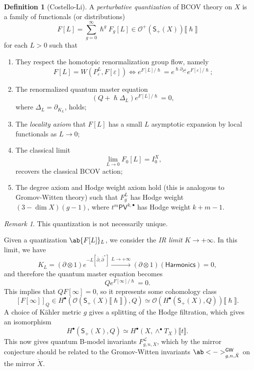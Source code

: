 \documentclass{amsart}
\theoremstyle{definition}
\newtheorem{defn}[thm]{Definition}
\theoremstyle{remark}
\newtheorem{rmk}[thm]{Remark}
\theoremstyle{plain}
\theoremstyle{definition}
\theoremstyle{remark}
\newcommand{\ep}{\varepsilon}
\newcommand{\mc}[1]{\mathcal{#1}}
\newcommand{\ms}[1]{\mathsf{#1}}
\newcommand{\1}{\mathbf{1}}
\newcommand{\2}{\mathbf{2}}
\newcommand{\3}{\mathbf{3}}
\newcommand{\ps}[1]{\lBrack #1 \rBrack}
\newcommand{\dbar}{\bar{\partial}}
\begin{document}
\begin{defn}[Costello-Li]
    A \textit{perturbative quantization} of BCOV theory on \(X\) is a family of functionals (or distributions)
    \[ F[L] = \sum_{g =0}^{\infty} \hslash^g F_g[L] \in \mc{O}^+(\ms{S}_+(X)) \ps{\hslash} \]
    for each \(L > 0\) such that
    \begin{enumerate}
        \item They respect the homotopic renormalization group flow, namely
        \[ F[L] = W(P_{\ep}^L, F[\ep]) \iff e^{F[L]/\hslash} = e^{\hslash \partial_{P_{\ep}^L}} e^{F[\ep]/\hslash}; \]
        \item The renormalized quantum master equation
        \[ (Q + \hslash \Delta_L) e^{F[L]/\hslash} = 0, \]
        where \(\Delta_L = \partial_{K_L}\), holds;
        \item The \textit{locality axiom} that \(F[L]\) has a small \(L\) asymptotic expansion by local functionals as \(L \to 0\);
        \item The classical limit
        \[ \lim_{L \to 0} F_0[L] = I_0^X, \]
        recovers the classical BCOV action;
        \item The degree axiom and Hodge weight axiom hold (this is analogous to Gromov-Witten theory) such that \(F_g^L\) has Hodge weight \((3-\dim X)(g-1)\), where \(t^m \ms{PV}^{k, \bullet}\) has Hodge weight \(k+m-1\).
    \end{enumerate}
\end{defn}

\begin{rmk}
    This quantization is not necessarily unique.
\end{rmk}

Given a quantization \(\ab\{ F[L]\}_L \), we consider the \textit{IR limit} \(K \to +\infty\). In this limit, we have
\[ K_L = (\partial \otimes 1) e^{-L [\dbar, \dbar^*]} \xrightarrow{L \to +\infty} (\partial \otimes 1) (\ms{Harmonics}) = 0, \]
and therefore the quantum master equation becomes
\[ Q e^{F[\infty]/\hslash} = 0. \]
This implies that \(Q F[\infty] = 0\), so it represents some cohomology class
\[ [F[\infty]]_Q \in H^{\bullet}(\mc{O}(\ms{S}_+(X)\ps{\hslash}), Q) \simeq \mc{O}(H^{\bullet}(\ms{S}_+(X), Q)) \ps{\hslash}. \]
A choice of K\"ahler metric \(g\) gives a splitting of the Hodge filtration, which gives an isomorphism
\[ H^{\bullet}(\ms{S}_+(X), Q) \simeq H^{\bullet}(X, \wedge^{\bullet} T_X) \ps{t}. \]
This now gives quantum B-model invariants \(F_{g,n,X}^{\mc{L}}\), which by the mirror conjecture should be related to the Gromov-Witten invariants \(\ab<->_{g,n,\check{X}}^{\ms{GW}}\) on the mirror \(\check{X}\).
\end{document}
